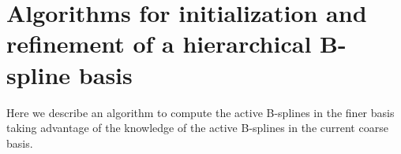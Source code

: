 \documentclass[12pt,a4paper,pdftex]{article}
\theoremstyle{plain}
\theoremstyle{definition}
\theoremstyle{remark}
\newcommand\NN{\mathbb N}
\newcommand\BB{\mathcal B}
\newcommand\HH{\mathcal H}
\begin{document}

\section{Algorithms for initialization and refinement of a hierarchical B-spline basis}


Here we describe an algorithm to compute the active B-splines in the finer basis taking advantage of the knowledge of the active B-splines in the current coarse basis.
\end{document}

